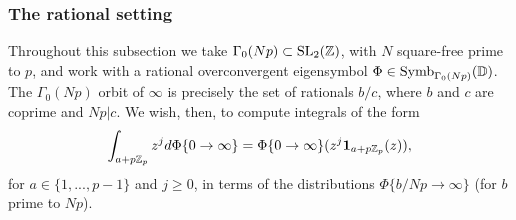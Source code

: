\documentclass[a4paper,10pt]{article}
\numberwithin{equation}{section}
\begin{document}
\begin{comment}
To prove the second claim, the definition clearly makes $\Phi$ to be linear on $\Div^0(\mathbb{P}^1(\Q))$, so it is enough to check $\Gamma$-equivariance. This follows from the following calculation:
\begin{align*}
\Phi\{g\gamma_jc_j\rightarrow g\gamma_ic_i\}&=\varphi(g\gamma_j)-\varphi(g\gamma_i) = 
g\gamma_j\varphi(\gamma_j^{-1}g^{-1}) - g\gamma_i\varphi(\gamma_i^{-1}g^{-1})\\
&=\left(g\gamma_j\varphi(\gamma_j^{-1}) + g\varphi(g^{-1})\right) -\left(g\gamma_i\varphi(\gamma_i^{-1}) + g\varphi(g^{-1})\right)\\
&= g\left(\gamma_j\varphi(\gamma_j^{-1}) - \gamma_i\varphi(\gamma_i^{-1})\right)\\
&=g\Phi\{\gamma_jc_j\rightarrow \gamma_ic_i\}.
\end{align*}

The third claim is obvious: since $\infty=c_1$, we have
\[
(\delta\Phi)(\gamma)=\Phi\{\infty\rightarrow\gamma\infty\} = \varphi(1)-\gamma\varphi(\gamma^{-1})-\varphi(1)=\varphi(\gamma).
\]
\end{proof}

The modular symbol thus defined is not an eigensymbol, in general. Since $\delta$ is Hecke-equivariant, we have:
\[
\delta(T(f) - f) = 0,
\]
and so $T(f) = f + \epsilon$, where $\epsilon$ is an Eistenstein symbol. In order to obtain an eigensymbol it suffices to apply for example $T_\ell-\ell-1$ for any prime $\ell$.
      
\end{comment}


\subsubsection{The rational setting}
Throughout this subsection we take $\Gamma_0(Np) \subset \mathrm{SL}_2(\mathbb{Z})$, with $N$ square-free prime to $p$, and work with a rational overconvergent eigensymbol $\Phi \in \mathrm{Symb}_{\Gamma_0(Np)}(\mathbb{D})$. The $\Gamma_0(Np)$ orbit of $\infty$ is precisely the set of rationals $b/c$, where $b$ and $c$ are coprime and $Np|c$. We wish, then, to compute integrals of the form
\[
 \int_{a+p\mathbb{Z}_p}z^j d\Phi\{0\rightarrow\infty\} = \Phi\{0\rightarrow\infty\}(z^j\mathbf{1}_{a+p\mathbb{Z}_p}(z)),
\]
for $a \in \{1,...,p-1\}$ and $j \geq 0$, in terms of the distributions $\Phi\{b/Np\rightarrow\infty\}$ (for $b$ prime to $Np$).
\end{document}
